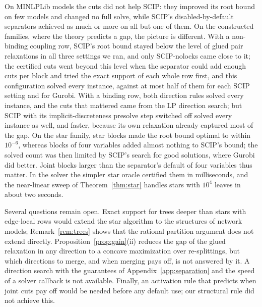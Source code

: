 On MINLPLib models the cuts did not help SCIP: they improved its root bound on
few models and changed no full solve, while SCIP's disabled-by-default
separators achieved as much or more on all but one of them. On the constructed
families, where the theory predicts a gap, the picture is different. With a
non-binding coupling row, SCIP's root bound stayed below the level of glued
pair relaxations in all three settings we ran, and only SCIP-nolocks came close
to it; the certified cuts went beyond this level when the separator could add
enough cuts per block and tried the exact support of each whole row first, and
this configuration solved every instance, against at most half of them for
each SCIP setting and for Gurobi. With a binding row, both direction rules
solved every instance, and the cuts that mattered came from the LP direction
search; but SCIP with its implicit-discreteness presolve step switched off
solved every instance as well, and faster, because its own relaxation already
captured most of the gap. On the star family, star blocks made the root bound
optimal to within $10^{-6}$, whereas blocks of four variables added almost
nothing to SCIP's bound; the solved count was then limited by SCIP's search for
good solutions, where Gurobi did better. Joint blocks larger than the
separator's default of four variables thus matter. In the solver the simpler
star oracle certified them in milliseconds, and the near-linear sweep of
Theorem~\ref{thm:star} handles stars with $10^4$ leaves in about two seconds.

Several questions remain open. Exact support for trees deeper than stars with
edge-local rows would extend the star algorithm to the structures of network
models; Remark~\ref{rem:trees} shows that the rational partition argument
does not extend directly. Proposition~\ref{prop:gain}(ii) reduces the gap of
the glued relaxation in any direction to a concave maximization over
re-splittings, but which directions to merge, and when merging pays off, is
not answered by it. A direction search with the guarantees of
Appendix~\ref{app:separation} and the speed of a solver callback is not
available. Finally, an activation rule that predicts when joint cuts pay off
would be needed before any default use; our structural rule did not achieve
this.
